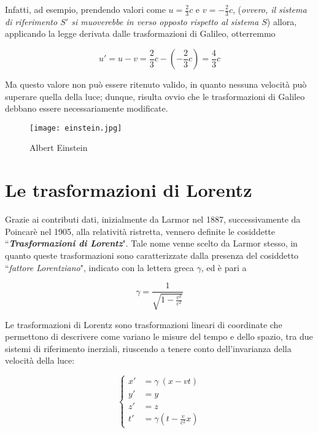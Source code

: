 \documentclass{article}
\begin{document}
Infatti, ad esempio, prendendo valori come \(u = \frac{2}{3}c\) e \(v = - \frac{2}{3}c\),
(\textit{ovvero, il sistema di riferimento \(S'\) si muoverebbe in verso opposto rispetto
al sistema \(S\)}) allora, applicando la legge derivata dalle trasformazioni
di Galileo, otterremmo

\begin{equation}
    u' = u - v = \frac{2}{3}c - (- \frac{2}{3}c) = \frac{4}{3}c
\end{equation}

Ma questo valore non può essere ritenuto valido, in quanto nessuna
velocità può superare quella della luce; dunque, risulta ovvio che le
trasformazioni di Galileo debbano essere necessariamente modificate.

\begin{figure}[htbp]
    \label{einstein}
    \centerline{\texttt{[image: einstein.jpg]}}
    \caption{Albert Einstein}
\end{figure}

\section{Le trasformazioni di Lorentz}
Grazie ai contributi dati, inizialmente da Larmor nel 1887, successivamente
da Poincarè nel 1905, alla relatività ristretta, vennero definite le
cosiddette ``\textbf{\textit{Trasformazioni di Lorentz}}". Tale nome venne
scelto da Larmor stesso, in quanto queste trasformazioni sono caratterizzate
dalla presenza del cosiddetto ``\textit{fattore Lorentziano}", indicato con
la lettera greca \(\gamma\), ed è pari a

\begin{equation}
    \label{gamma}
    \gamma = \frac{1}{\sqrt{1 - \frac{v^2}{c^2}}} 
\end{equation}

Le trasformazioni di Lorentz sono trasformazioni lineari di coordinate
che permettono di descrivere come variano le misure del tempo e dello spazio,
tra due sistemi di riferimento inerziali, riuscendo a tenere conto
dell'invarianza della velocità della luce:

\begin{equation}
    \left\{
        \begin{aligned}
        x' &= \gamma\ (x - vt) \\
        y' &= y \\
        z' &= z \\
        t' &= \gamma \left(t - \frac{v}{c^2} x\right)
        \end{aligned}
    \right.
\end{equation}
\end{document}
